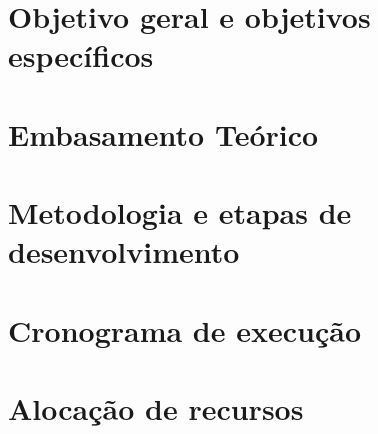 \documentclass[
	12pt,				%
	openright,			%
	oneside,			%
	a4paper,			%
	chapter=TITLE,		%
	section=TITLE,		%
	english,			%
	french,				%
	spanish,			%
	brazil				%
	]{abntex2}
\begin{document}
\chapter[Objetivo geral e objetivos específicos]{Objetivo geral e objetivos específicos}


\chapter[Embasamento Teórico]{Embasamento Teórico}


\chapter[Metodologia e etapas de desenvolvimento]{Metodologia e etapas de desenvolvimento}


\chapter[Cronograma de execução]{Cronograma de execução}


\chapter[Alocação de recursos
]{Alocação de recursos}



\postextual


\renewcommand{\bibname}{Referências Bibliográficas}



\begin{apendicesenv}
\partapendices


\end{apendicesenv}


\begin{anexosenv}
%
\partanexos

\end{anexosenv}

\printindex
\end{document}
